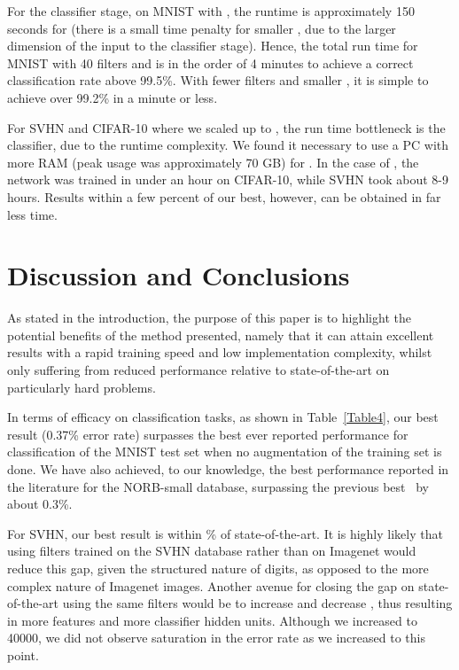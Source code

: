 \documentclass[conference]{IEEEtran}
\begin{document}
For the classifier stage, on MNIST with , the runtime is approximately 150 seconds for  (there is a small time penalty for smaller , due to the larger dimension of the input to the classifier stage). Hence, the total run time for MNIST with 40 filters and  is in the order of 4 minutes to achieve a correct classification rate above  99.5\%. With fewer filters and smaller , it is simple to achieve over 99.2\% in a minute or less.

For SVHN and CIFAR-10 where we scaled up to , the run time bottleneck is the classifier, due to the  runtime complexity. We found it necessary to use a PC with more RAM (peak usage was approximately 70 GB) for . In the case of , the network was trained in under an hour on CIFAR-10, while SVHN took about 8-9 hours.  Results within a few percent of our best, however, can be obtained in far less time.


\section{Discussion and Conclusions}\label{S:5}

As stated in the introduction, the purpose of this paper is to highlight the potential benefits of the method presented, namely that it can attain excellent results with a rapid training speed  and low implementation complexity, whilst only suffering from reduced performance relative to state-of-the-art on particularly hard problems.

In terms of efficacy on classification tasks, as shown in Table~\ref{Table4}, our best result (0.37\% error rate) surpasses the best ever reported performance for classification of the MNIST test set when no  augmentation of the training set is done. We have also achieved, to our knowledge, the best performance reported in the literature for the NORB-small database, surpassing the previous best~\cite{Ciresan.11} by about 0.3\%.

For SVHN, our best result is within \% of state-of-the-art. It is highly likely that using  filters trained on the SVHN database rather than on Imagenet would reduce this gap, given the structured nature of digits, as opposed to the more complex nature of Imagenet images. Another avenue for closing the gap on state-of-the-art using the same filters would be to increase  and decrease , thus resulting in more features and more classifier hidden units. Although we increased  to 40000, we did not observe saturation in the error rate as we increased  to this point.
\end{document}

